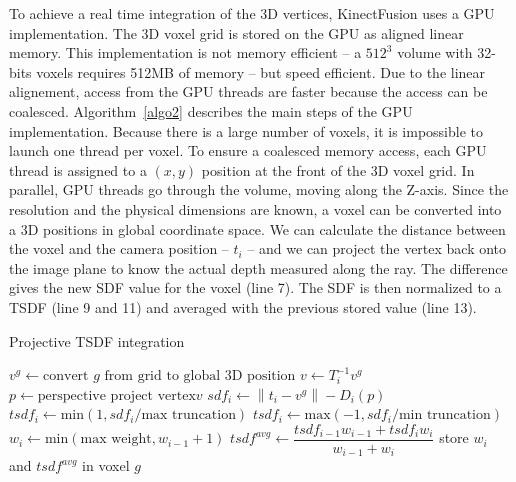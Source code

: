 \documentclass[12pt]{article}
\begin{document}
To achieve a real time integration of the 3D vertices, KinectFusion uses a GPU implementation. The 3D voxel grid is stored on the GPU as aligned linear memory. This implementation is not memory efficient -- a $512^3$ volume with 32-bits voxels requires 512MB of memory -- but speed efficient. Due to the linear alignement, access from the GPU threads are faster because the access can be coalesced. Algorithm~\ref{algo2} describes the main steps of the GPU implementation. Because there is a large number of voxels, it is impossible to launch one thread per voxel. To ensure a coalesced memory access, each GPU thread is assigned to a $(x,y)$ position at the front of the 3D voxel grid. In parallel, GPU threads go through the volume, moving along the Z-axis. Since the resolution and the physical dimensions are known, a voxel can be converted into a 3D positions in global coordinate space. We can calculate the distance between the voxel and the camera position -- $t_i$ -- and we can project the vertex back onto the image plane to know the actual depth measured along the ray. The difference gives the new SDF value for the voxel (line 7). The SDF is then normalized to a TSDF (line 9 and 11) and averaged with the previous stored value    (line 13).

\begin{algorithm}
\caption{Projective TSDF integration}\label{algo2}
\begin{algorithmic}[1]
  \State $v^g \gets \text{convert }g\text{ from grid to global 3D position}$
  \State $v \gets T_i^{-1}v^g$
  \State $p \gets \text{perspective project vertex} v$
    \State $sdf_i \gets \left\|t_i-v^{g}\right\| - D_i(p)$
      \State $tsdf_i \gets \text{min}(1, sdf_i/\text{max truncation})$
      \Else
      \State $tsdf_i \gets \text{max}(-1, sdf_i/\text{min truncation})$
      \EndIf
    \State $w_i \gets \text{min}(\text{max weight}, w_{i-1}+1)$
    \State $tsdf^{avg} \gets \dfrac{tsdf_{i-1}w_{i-1}+tsdf_iw_i}{w_{i-1}+w_i}$
    \State store $w_i$ and $tsdf^{avg}$ in voxel $g$
    \EndIf
  \EndWhile
\EndFor
\end{algorithmic}
\end{algorithm}
\end{document}
